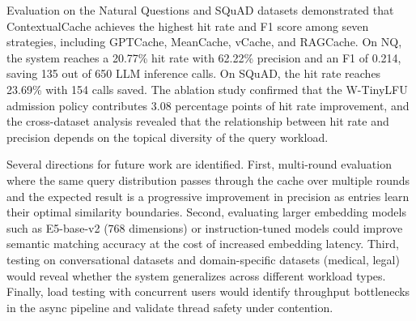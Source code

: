 \documentclass[conference]{IEEEtran}
\begin{document}
Evaluation on the Natural Questions and SQuAD datasets demonstrated that ContextualCache achieves the highest hit rate and F1 score among seven strategies, including GPTCache, MeanCache, vCache, and RAGCache. On NQ, the system reaches a 20.77\% hit rate with 62.22\% precision and an F1 of 0.214, saving 135 out of 650 LLM inference calls. On SQuAD, the hit rate reaches 23.69\% with 154 calls saved. The ablation study confirmed that the W-TinyLFU admission policy contributes 3.08 percentage points of hit rate improvement, and the cross-dataset analysis revealed that the relationship between hit rate and precision depends on the topical diversity of the query workload.

Several directions for future work are identified. First, multi-round evaluation where the same query distribution passes through the cache over multiple rounds and the expected result is a progressive improvement in precision as entries learn their optimal similarity boundaries. Second, evaluating larger embedding models such as E5-base-v2 (768 dimensions) or instruction-tuned models could improve semantic matching accuracy at the cost of increased embedding latency. Third, testing on conversational datasets and domain-specific datasets (medical, legal) would reveal whether the system generalizes across different workload types. Finally, load testing with concurrent users would identify throughput bottlenecks in the async pipeline and validate thread safety under contention.


\end{document}
